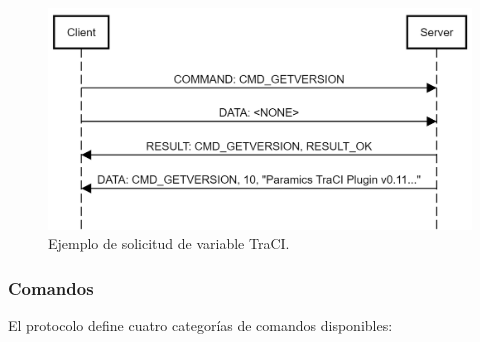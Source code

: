 \begin{figure}
    \centering
    \includegraphics[width=1.0\linewidth]{imagenes/traci_getversion}
    \caption{Ejemplo de solicitud de variable TraCI.}
    \label{fig:tracigetversion}
\end{figure}


\subsubsection{Comandos}

El protocolo define cuatro categorías de comandos disponibles:

